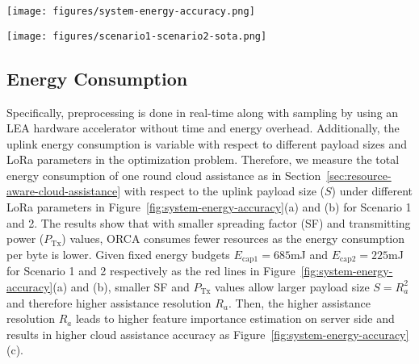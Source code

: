 \begin{figure*}[tp]
    \centering
    \texttt{[image: figures/system-energy-accuracy.png]}
    \vspace{-0.7cm}
    \caption{The total energy usage for one round of cloud assistance with various uplink payload payloads and LoRa parameters, (a) for Scenario 1 and (b) for Scenario 2. (c) is for accuracy measurement given payloads. }
    \label{fig:system-energy-accuracy}
    \vspace{0cm}
\end{figure*}


\begin{figure*}[tp]
    \centering
    \texttt{[image: figures/scenario1-scenario2-sota.png]}
    \vspace{-0.6cm}
    \caption{The average accuracy, energy, and end-to-end latency for baselines in Scenario 1 (left) and 2 (right).}
    \vspace{-0.2cm}
    \label{fig:scenarios-sota}
\end{figure*}




\subsection{Energy Consumption}

 Specifically, preprocessing is done in real-time along with sampling by using an LEA hardware accelerator without time and energy overhead. Additionally, the uplink energy consumption is variable with respect to different payload sizes and LoRa parameters in the optimization problem. Therefore, we measure the total energy consumption of one round cloud assistance as in Section~\ref{sec:resource-aware-cloud-assistance} with respect to the uplink payload size ($S$) under different LoRa parameters in Figure~\ref{fig:system-energy-accuracy}(a) and (b) for Scenario 1 and 2. The results show that with smaller spreading factor (SF) and transmitting power ($P_{\text{Tx}}$) values, ORCA consumes fewer resources as the energy consumption per byte is lower. Given fixed energy budgets $E_{\text{cap1}}=685$mJ and $E_{\text{cap2}}=225$mJ for Scenario 1 and 2 respectively as the red lines in Figure~\ref{fig:system-energy-accuracy}(a) and (b), smaller SF and $P_{\text{Tx}}$ values allow larger payload size $S=R_a^2$ and therefore higher assistance resolution $R_a$. Then, the higher assistance resolution $R_a$ leads to higher feature importance estimation on server side and results in higher cloud assistance accuracy as Figure~\ref{fig:system-energy-accuracy}(c). 
 
